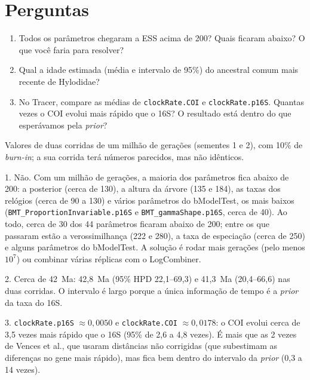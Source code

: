 \documentclass[11pt,a4paper]{article}
\begin{document}
\section*{Perguntas}

\begin{enumerate}
\item Todos os parâmetros chegaram a ESS acima de 200? Quais ficaram abaixo? O que você faria
para resolver?
\item Qual a idade estimada (média e intervalo de 95\%) do ancestral comum mais recente de
Hylodidae?
\item No Tracer, compare as médias de \verb|clockRate.COI| e \verb|clockRate.p16S|. Quantas
vezes o COI evolui mais rápido que o 16S? O resultado está dentro do que esperávamos pela
\emph{prior}?
\end{enumerate}

\begin{resposta}
Valores de duas corridas de um milhão de gerações (sementes 1 e 2), com 10\% de
\emph{burn-in}; a sua corrida terá números parecidos, mas não idênticos.

1. Não. Com um milhão de gerações, a maioria dos parâmetros fica abaixo de 200: a posterior
(cerca de 130), a altura da árvore (135 e 184), as taxas dos relógios (cerca de 90 a 130) e
vários parâmetros do bModelTest, os mais baixos (\verb|BMT_ProportionInvariable.p16S| e
\verb|BMT_gammaShape.p16S|, cerca de 40). Ao todo, cerca de 30 dos 44 parâmetros ficaram
abaixo de 200; entre os que passaram estão a verossimilhança (222 e 280), a taxa de especiação
(cerca de 250) e alguns parâmetros do bModelTest. A solução é rodar mais gerações (pelo menos
$10^7$) ou combinar várias réplicas com o LogCombiner.

2. Cerca de 42~Ma: 42,8~Ma (95\% HPD 22,1--69,3) e 41,3~Ma (20,4--66,6) nas duas corridas.
O intervalo é largo porque a única informação de tempo é a \emph{prior} da taxa do 16S.

3. \verb|clockRate.p16S| $\approx 0{,}0050$ e \verb|clockRate.COI| $\approx 0{,}0178$: o COI
evolui cerca de 3,5 vezes mais rápido que o 16S (95\% de 2,6 a 4,8 vezes). É mais que as 2
vezes de Vences et al., que usaram distâncias não corrigidas (que subestimam as diferenças no
gene mais rápido), mas fica bem dentro do intervalo da \emph{prior} (0,3 a 14 vezes).
\end{resposta}

\appendix
\end{document}
